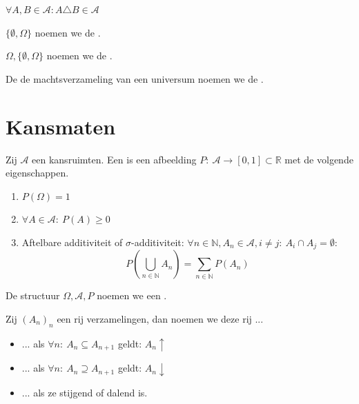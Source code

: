 \documentclass[main.tex]{subfiles}
\begin{document}
\begin{st}
  $\forall A,B \in \mathcal{A}: A \triangle B \in \mathcal{A}$
\end{st}

\begin{de}
  $\{ \emptyset, \Omega \}$ noemen we de .
\end{de}
\begin{de}
  $\Omega,\{ \emptyset, \Omega \}$ noemen we de .
\end{de}

\begin{de}
  De de machtsverzameling van een universum noemen we de .
\end{de}


\section{Kansmaten}
\label{sec:kansmaten}

\begin{de}
  Zij $\mathcal{A}$ een kansruimten.
  Een  is een afbeelding $P:\ \mathcal{A} \rightarrow [0,1] \subset \mathbb{R}$ met de volgende eigenschappen.
  \begin{enumerate}
  \item $P(\Omega) = 1$
  \item $\forall A \in \mathcal{A}:\ P(A) \ge 0$
  \item Aftelbare additiviteit of $\sigma$-additiviteit: $\forall n\in \mathbb{N}, A_{n} \in \mathcal{A}, i \neq j:\ A_{i}\cap A_{j} = \emptyset$:
    \[ P\left( \bigcup_{n\in\mathbb{N}}A_{n} \right) = \sum_{n\in\mathbb{N}}P(A_{n}) \]
  \end{enumerate}
  De structuur $\Omega,\mathcal{A},P$ noemen we een .
\end{de} 

\begin{de}
  Zij $(A_{n})_{n}$ een rij verzamelingen, dan noemen we deze rij ...
  \begin{itemize}
  \item ...  als $\forall n:\ A_{n}\subseteq A_{n+1}$ geldt: $A_{n}\uparrow$
  \item ...  als $\forall n:\ A_{n}\supseteq A_{n+1}$ geldt: $A_{n}\downarrow$
  \item ...  als ze stijgend of dalend is.
  \end{itemize}
\end{de}
\end{document}
